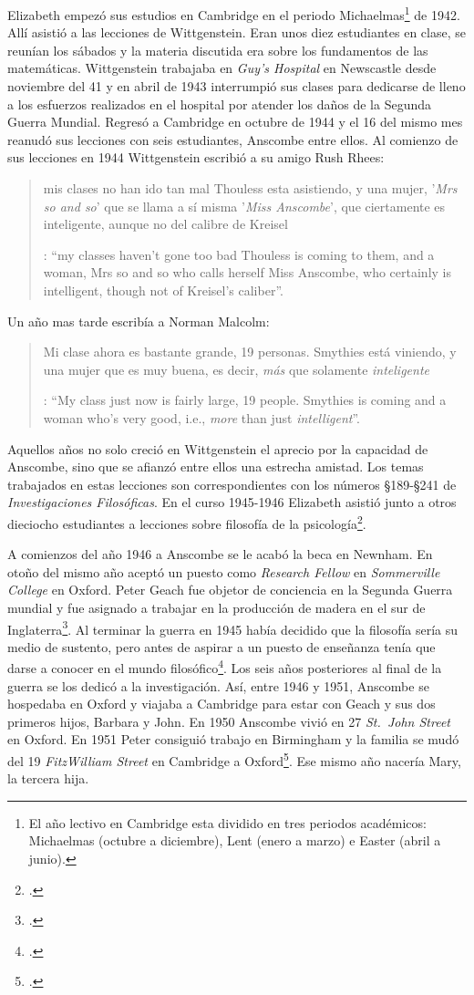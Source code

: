 Elizabeth empezó sus estudios en Cambridge en el periodo Michaelmas\footnote{El año lectivo en Cambridge esta dividido en tres periodos académicos: Michaelmas (octubre a diciembre), Lent (enero a marzo) e Easter (abril a junio).} de 1942. Allí asistió a las lecciones de Wittgenstein. Eran unos diez estudiantes en clase, se reunían los sábados y la materia discutida era sobre los fundamentos de las matemáticas. Wittgenstein trabajaba en \emph{Guy's Hospital} en Newscastle desde noviembre del 41 y en abril de 1943 interrumpió sus clases para dedicarse de lleno a los esfuerzos realizados en el hospital por atender los daños de la Segunda Guerra Mundial. Regresó a Cambridge en octubre de 1944 y el 16 del mismo mes reanudó sus lecciones con seis estudiantes, Anscombe entre ellos. Al comienzo de sus lecciones en 1944 Wittgenstein escribió a su amigo Rush Rhees: \blockquote[{\Cite[371]{wittgenstein2012letters}}: \enquote{my classes haven't gone too bad \textelp{} Thouless is coming to them, and a woman, Mrs so and so who calls herself Miss Anscombe, who certainly is intelligent, though not of Kreisel's caliber}.]{mis clases no han ido tan mal \textelp{} Thouless esta asistiendo, y una mujer, '\emph{Mrs so and so}' que se llama a sí misma '\emph{Miss Anscombe}', que ciertamente es inteligente, aunque no del calibre de Kreisel}. Un año mas tarde escribía a Norman Malcolm: \blockquote[{\Cite[388]{wittgenstein2012letters}}: \enquote{My class just now is fairly large, 19 people. \textelp{} Smythies is coming and a woman who's very good, i.e., \emph{more} than just \emph{intelligent}}.]{Mi clase ahora es bastante grande, 19 personas. \textelp{} Smythies está viniendo, y una mujer que es muy buena, es decir, \emph{más} que solamente \emph{inteligente}}. Aquellos años no solo creció en Wittgenstein el aprecio por la capacidad de Anscombe, sino que se afianzó entre ellos una estrecha amistad. Los temas trabajados en estas lecciones son correspondientes con los números \S189-\S241 de \emph{Investigaciones Filosóficas}. En el curso 1945-1946 Elizabeth asistió junto a otros dieciocho estudiantes a lecciones sobre filosofía de la psicología\footcite[Cf.][354-356]{KlaggeNordman2003pubnpriv}.

A comienzos del año 1946 a Anscombe se le acabó la beca en Newnham. En otoño del mismo año aceptó un puesto como \emph{Research Fellow} en \emph{Sommerville College} en Oxford. Peter Geach fue objetor de conciencia en la Segunda Guerra mundial y fue asignado a trabajar en la producción de madera en el sur de Inglaterra\footcite[Cf.][34]{teichman2002fellows}. Al terminar la guerra en 1945 había decidido que la filosofía sería su medio de sustento, pero antes de aspirar a un puesto de enseñanza tenía que darse a conocer en el mundo filosófico\footcite[Cf.][12]{geach1991philaut}. Los seis años posteriores al final de la guerra se los dedicó a la investigación. Así, entre 1946 y 1951, Anscombe se hospedaba en Oxford y viajaba a Cambridge para estar con Geach y sus dos primeros hijos, Barbara y John. En 1950 Anscombe vivió en 27 \emph{St.~John Street} en Oxford. En 1951 Peter consiguió trabajo en Birmingham y la familia se mudó del 19 \emph{FitzWilliam Street} en Cambridge a Oxford\footcite[Cf.][208]{NWR}. Ese mismo año nacería Mary, la tercera hija.

